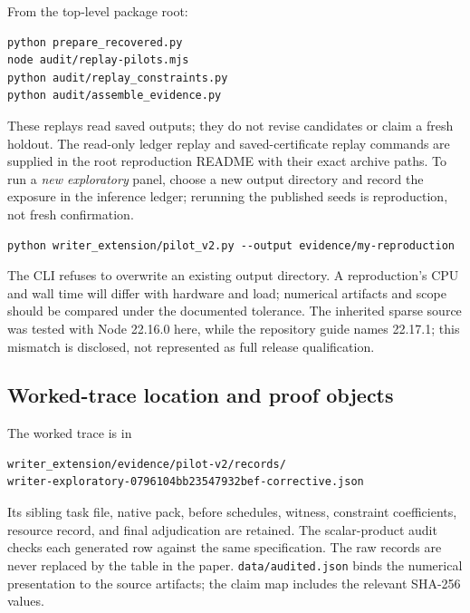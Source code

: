 From the top-level package root:

\begin{verbatim}
python prepare_recovered.py
node audit/replay-pilots.mjs
python audit/replay_constraints.py
python audit/assemble_evidence.py
\end{verbatim}

These replays read saved outputs; they do not revise candidates or claim
a fresh holdout. The read-only ledger replay and saved-certificate
replay commands are supplied in the root reproduction README with their
exact archive paths. To run a \emph{new exploratory} panel, choose a new
output directory and record the exposure in the inference ledger;
rerunning the published seeds is reproduction, not fresh confirmation.

\begin{verbatim}
python writer_extension/pilot_v2.py --output evidence/my-reproduction
\end{verbatim}

The CLI refuses to overwrite an existing output directory. A
reproduction's CPU and wall time will differ with hardware and load;
numerical artifacts and scope should be compared under the documented
tolerance. The inherited sparse source was tested with Node 22.16.0
here, while the repository guide names 22.17.1; this mismatch is
disclosed, not represented as full release qualification.

\subsection*{Worked-trace location and proof
objects}\label{worked-trace-location-and-proof-objects}

The worked trace is in

\begin{verbatim}
writer_extension/evidence/pilot-v2/records/
writer-exploratory-0796104bb23547932bef-corrective.json
\end{verbatim}

Its sibling task file, native pack, before schedules, witness,
constraint coefficients, resource record, and final adjudication are
retained. The scalar-product audit checks each generated row against the
same specification. The raw records are never replaced by the table in
the paper. \texttt{data/audited.json} binds the numerical presentation
to the source artifacts; the claim map includes the relevant SHA-256
values.

